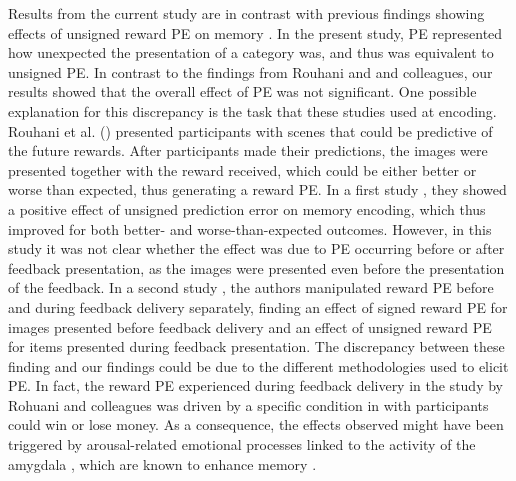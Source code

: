 \documentclass[a4paper,12pt]{article}
\begin{document}
\par
Results from the current study are in contrast with previous findings showing effects of unsigned reward PE on memory \citep{Rouhani2018, Rouhani2021}. In the present study, PE represented how unexpected the presentation of a category was, and thus was equivalent to unsigned PE. In contrast to the findings from Rouhani and and colleagues, our results showed that the overall effect of PE was not significant. One possible explanation for this discrepancy is the task that these studies used at encoding. Rouhani et al. (\citeyear{Rouhani2018, Rouhani2021}) presented participants with scenes that could be predictive of the future rewards. After participants made their predictions, the images were presented together with the reward received, which could be either better or worse than expected, thus generating a reward PE. In a first study \citep{Rouhani2018}, they showed a positive effect of unsigned prediction error on memory encoding, which thus improved for both better- and worse-than-expected outcomes. However, in this study it was not clear whether the effect was due to PE occurring before or after feedback presentation, as the images were presented even before the presentation of the feedback. In a second study \citep{Rouhani2021}, the authors manipulated reward PE before and during feedback delivery separately, finding an effect of signed reward PE for images presented before feedback delivery and an effect of unsigned reward PE for items presented during feedback presentation. The discrepancy between these finding and our findings could be due to the different methodologies used to elicit PE. In fact, the reward PE experienced during feedback delivery in the study by Rohuani and colleagues \citep{Rouhani2021} was driven by a specific condition in with participants could win or lose money. As a consequence, the effects observed might have been triggered by arousal-related emotional processes linked to the activity of the amygdala \citep{watanabe2019reward}, which are known to enhance memory  \citep{mather2011arousal}. 

\end{document}

